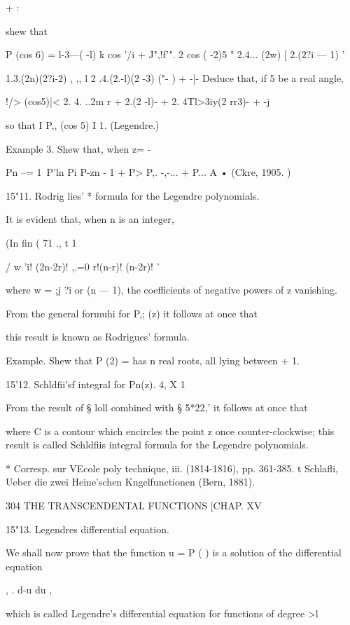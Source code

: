 + : 



shew that 

P  (cos 6) = l-3---(   -l) k cos '/i  + J",!f'".  2 cos (  -2)5 
  "  2.4... (2w) [ 2.(2?i — 1)   ' 

1.3.(2n)(2?i-2)   , ,, l 
2 .4.(2.-l)(2  -3)  ("- )  + -|- 
Deduce that, if 5 be a real angle, 

!/> (cos5)|< 2. 4. ..2m r + 2.(2 -l)-  + 2. 4Tl>3iy(2 rr3)-  + -j 

so that I P,, (cos 5) I   1. (Legendre.) 

Example 3. Shew that, when z= -\, 

Pn --= 1\ P'ln  Pi P-zn - 1 + P> P,. -,-... + P... A • (Ckre, 1905. ) 

15"11. Rodrig lies' * formula for the Legendre polynomials. 

It is evident that, when n is an integer, 

(In fin ( 71 ., t 1 

  / w 'i! (2n-2r)! 
,.=0  r!(n-r)! (n-2r)! ' 

where w = ;j ?i or   (n — 1), the coefficients of negative powers of z vanishing. 

From the general formuhi for P,; (z) it follows at once that 

this result is known as Rodrigues' formula. 

Example. Shew that P  (2) = has n real roots, all lying between + 1. 

15'12. Schldfii'sf integral for Pn(z). 4, X 1 

From the result of § loll combined with § 5*22,' it follows at once that 

where C is a contour which encircles the point z once counter-clockwise; this 
result is called Schldfiis integral formula for the Legendre polynomials. 

* Corresp. sur VEcole poly technique, iii. (1814-1816), pp. 361-385. 
t Schlafli, Ueber die zwei Heine'schen Kngelfunctionen (Bern, 1881). 



304 THE TRANSCENDENTAL FUNCTIONS [CHAP. XV 

15"13. Legendres differential equation. 

We shall now prove that the function u = P  ( ) is a solution of the 
differential equation 

,   . d-u   du , 

which is called Legendre's differential equation for functions of degree >l 

